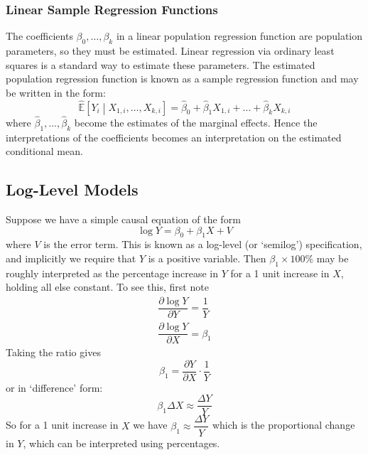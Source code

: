 \documentclass[11pt]{report} %
\begin{document}
\subsubsection{Linear Sample Regression Functions}

The coefficients $\beta_{0}, \dots, \beta_{k}$ in a linear population regression function are population parameters, so they must be estimated. Linear regression via ordinary least squares is a standard way to estimate these parameters. The estimated population regression function is known as a sample regression function and may be written in the form:
\begin{equation}
\widehat{\mathbb{E}}\left[Y_{i}\middle|X_{1, i}, \dots, X_{k, i}\right] = \widehat{\beta}_{0} + \widehat{\beta}_{1}X_{1, i} + \dots + \widehat{\beta}_{k}X_{k, i}
\end{equation}
where $\widehat{\beta}_{1}, \dots, \widehat{\beta}_{k}$ become the estimates of the marginal effects. Hence the interpretations of the coefficients becomes an interpretation   on the estimated conditional mean.

\subsection{Log-Level Models}

Suppose we have a simple causal equation of the form
\begin{equation}
\log Y = \beta_{0} + \beta_{1}X + V
\end{equation}
where $V$ is the error term. This is known as a log-level (or `semilog') specification, and implicitly we require that $Y$ is a positive variable. Then $\beta_{1}\times 100\%$ may be roughly interpreted as the percentage increase in $Y$ for a 1 unit increase in $X$, holding all else constant. To see this, first note 
\begin{gather}
\dfrac{\partial \log Y}{\partial Y} = \dfrac{1}{Y} \\
\dfrac{\partial \log Y}{\partial X} = \beta_{1}
\end{gather}
Taking the ratio gives
\begin{equation}
\beta_{1} = \dfrac{\partial Y}{\partial X}\cdot\dfrac{1}{Y}
\end{equation}
or in `difference' form:
\begin{equation}
\beta_{1}\Delta X \approx \dfrac{\Delta Y}{Y}
\end{equation}
So for a 1 unit increase in $X$ we have $\beta_{1} \approx \dfrac{\Delta Y}{Y}$ which is the proportional change in $Y$, which can be interpreted using percentages.
\end{document}
